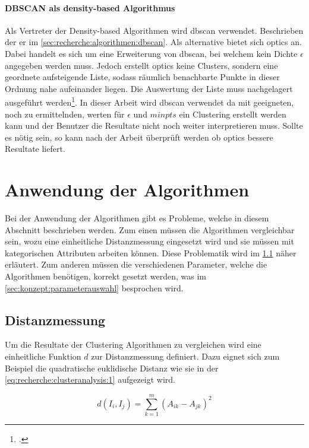 \paragraph{DBSCAN als density-based Algorithmus}
\label{sec:konzept:algorithmenauswahl:clustering:dbscan}
Als Vertreter der Density-based Algorithmen wird \gls{dbscan} verwendet. Beschrieben der er im \cref{sec:recherche:algorithmen:dbscan}. Als alternative bietet sich \gls{optics} an. Dabei handelt es sich um eine Erweiterung von \gls{dbscan}, bei welchem kein Dichte $\epsilon$ angegeben werden muss. Jedoch erstellt \gls{optics} keine Clusters, sondern eine geordnete aufsteigende Liste, sodass räumlich benachbarte Punkte in dieser Ordnung nahe aufeinander liegen. Die Auswertung der Liste muss nachgelagert ausgeführt werden\footcite{data_mining_concepts_and_techniques}. In dieser Arbeit wird \gls{dbscan} verwendet da mit geeigneten, noch zu ermittelnden, werten für $\epsilon$ und $minpts$ ein Clustering erstellt werden kann und der Benutzer die Resultate nicht noch weiter interpretieren muss. Sollte es nötig sein, so kann nach der Arbeit überprüft werden ob \gls{optics} bessere Resultate liefert.

\section{Anwendung der Algorithmen}
Bei der Anwendung der Algorithmen gibt es Probleme, welche in diesem Abschnitt beschrieben werden. Zum einen müssen die Algorithmen vergleichbar sein, wozu eine einheitliche Distanzmessung eingesetzt wird und sie müssen mit kategorischen Attributen arbeiten können. Diese Problematik wird im \cref{sec:konzept:algorithmenauswahl:clustering:distanzmessung} näher erläutert. Zum anderen müssen die verschiedenen Parameter, welche die Algorithmen benötigen, korrekt gesetzt werden, was im \cref{sec:konzept:parameterauswahl} besprochen wird.

\subsection{Distanzmessung}
\label{sec:konzept:algorithmenauswahl:clustering:distanzmessung}
Um die Resultate der Clustering Algorithmen zu vergleichen wird eine einheitliche Funktion $d$ zur Distanzmessung definiert.
Dazu eignet sich zum Beispiel die quadratische euklidische Distanz wie sie in der \cref{eq:recherche:clusteranalysis:1} aufgezeigt wird.

\begin{equation} \label{eq:recherche:clusteranalysis:1}
d(I_i, I_j) = \sum_{k=1}^{m} (A_{ik} - A_{jk})^2
\end{equation}

